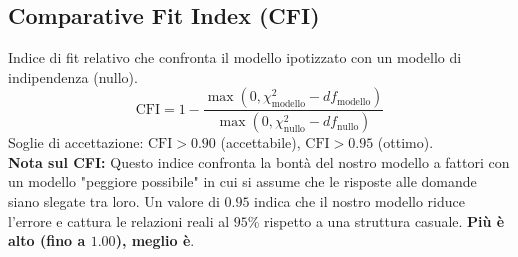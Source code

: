 \documentclass[11pt,a4paper]{article}
\begin{document}
\subsection{Comparative Fit Index (CFI)}
Indice di fit relativo che confronta il modello ipotizzato con un modello di indipendenza (nullo).
\begin{equation}
\text{CFI} = 1 - \frac{\max(0, \chi^2_{\text{modello}} - df_{\text{modello}})}{\max(0, \chi^2_{\text{nullo}} - df_{\text{nullo}})}
\end{equation}
Soglie di accettazione: $\text{CFI} > 0.90$ (accettabile), $\text{CFI} > 0.95$ (ottimo).
\\
\textbf{Nota sul CFI:} Questo indice confronta la bontà del nostro modello a fattori con un modello "peggiore possibile" in cui si assume che le risposte alle domande siano slegate tra loro. Un valore di $0.95$ indica che il nostro modello riduce l'errore e cattura le relazioni reali al $95\%$ rispetto a una struttura casuale. \textbf{Più è alto (fino a $1.00$), meglio è}.
\end{document}
